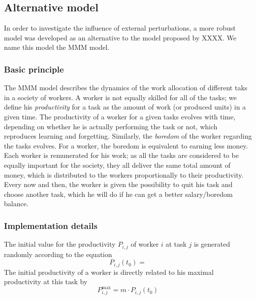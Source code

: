 \subsection{Alternative model}

In order to investigate the influence of external perturbations, a more robust model was developed as an alternative to the model proposed by XXXX. We name this model the MMM model.

\subsubsection{Basic principle}
The MMM model describes the dynamics of the work allocation of different taks in a society of workers. 
A worker is not equally skilled for all of the tasks; we define his \emph{productivity} for a task as the amount of work (or produced units) in a given time. 
The productivity of a worker for a given tasks evolves with time, depending on whether he is actually performing the task or not, which reproduces learning and forgetting. Similarly, the \emph{boredom} of the worker regarding the tasks evolves. For a worker, the boredom is equivalent to earning less money.
Each worker is remunerated for his work; as all the tasks are considered to be equally important for the society, they all deliver the same total amount of money, which is distributed to the workers proportionally to their productivity.
Every now and then, the worker is given the possibility to quit his task and choose another task, which he will do if he can get a better salary/boredom balance. 


\subsubsection{Implementation details}
The initial value for the productivity $P_{i,j}$ of worker $i$ at task $j$ is generated randomly according to the equation
\begin{equation}
	P_{i,j}(t_0) = 
\end{equation}
The initial productivity of a worker is directly related to his maximal productivity at this task by
\begin{equation}
	P_{i,j}^\textrm{max} = m \cdot P_{i,j}(t_0)
\end{equation}
